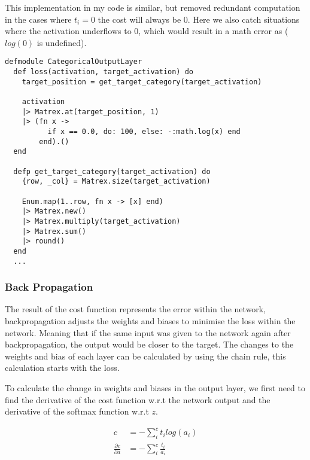 This implementation in my code is similar, but removed redundant computation in
the cases where \(t_{i} = 0\) the cost will always be 0. Here we also catch
situations where the activation underflows to 0, which would result in a math
error as (\(log(0)\) is undefined).
\begin{lstlisting}
defmodule CategoricalOutputLayer
  def loss(activation, target_activation) do
    target_position = get_target_category(target_activation)

    activation
    |> Matrex.at(target_position, 1)
    |> (fn x ->
          if x == 0.0, do: 100, else: -:math.log(x) end
        end).()
  end

  defp get_target_category(target_activation) do
    {row, _col} = Matrex.size(target_activation)

    Enum.map(1..row, fn x -> [x] end)
    |> Matrex.new()
    |> Matrex.multiply(target_activation)
    |> Matrex.sum()
    |> round()
  end
  ...
\end{lstlisting}


\subsubsection{Back Propagation}
The result of the cost function represents the error within the network,
backpropagation adjusts the weights and biases to minimise the loss
 within the network. Meaning that if the same input was
given to the network again after backpropagation, the output would be closer to
the target. The changes to the weights and bias of each layer can be calculated
by using the chain rule, this calculation starts with the loss.

To calculate the change in weights and biases in the output layer, we first need
to find the derivative of the cost function w.r.t the network output and the
derivative of the softmax function w.r.t \(z\).

\begin{equation}
    \begin{aligned}
        c &= - \sum_{i}^{c} t_{i}log(a_{i}) \\
        \frac{\partial c}{\partial a} &= - \sum_{i}^{c} \frac{t_{i}}{a_{i}}
    \end{aligned}
\end{equation}

